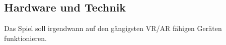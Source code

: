 \subsection{Hardware und Technik}\label{subsec:hardware}
Das Spiel soll irgendwann auf den gängigsten VR/AR fähigen Geräten funktionieren.
